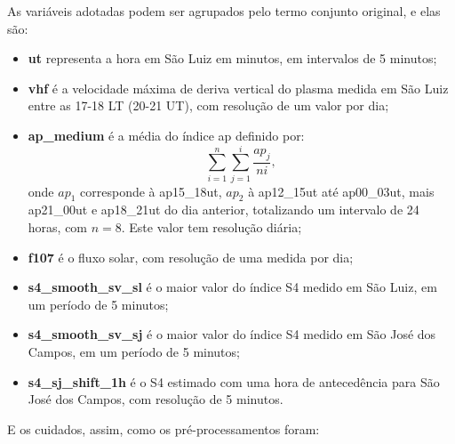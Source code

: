 As variáveis adotadas podem ser agrupados pelo termo conjunto original, e elas são:

\begin{itemize}
\item {\bf ut} representa a hora em São Luiz em minutos, em intervalos de 5 minutos;
\item {\bf vhf} é a velocidade máxima de deriva vertical do plasma medida em São Luiz entre as 17-18 LT (20-21 UT), com resolução de um valor por dia;
\item {\bf ap\_medium} é a média do índice ap definido por:
\begin{equation}\label{eq:ap}
\sum_{i=1}^{n}\sum_{j=1}^{i}\frac{ap_{j}}{ni}\mbox{,}~
\end{equation}
onde $ap_1$ corresponde à ap15\_18ut, $ap_2$ à ap12\_15ut até ap00\_03ut, mais ap21\_00ut e ap18\_21ut do dia anterior, totalizando um intervalo de 24 horas, com $n=8$. Este valor tem resolução diária;
\item {\bf f107} é o fluxo solar, com resolução de uma medida por dia;
\item {\bf s4\_smooth\_sv\_sl} é o maior valor do índice S4 medido em São Luiz, em um período de 5 minutos;
\item {\bf s4\_smooth\_sv\_sj} é o maior valor do índice S4 medido em São José dos Campos, em um período de 5 minutos;
\item {\bf s4\_sj\_shift\_1h} é o S4 estimado com uma hora de antecedência para São José dos Campos, com resolução de 5 minutos.
\end{itemize}

E os cuidados, assim, como os pré-processamentos foram:

